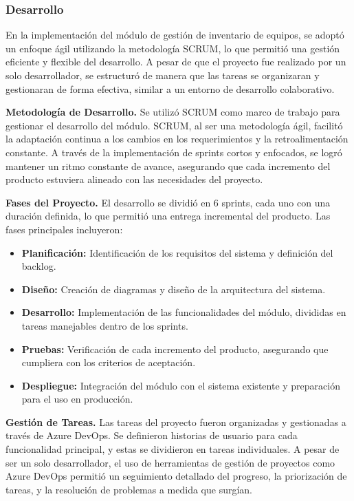 \documentclass[stu, 12pt, letterpaper, donotrepeattitle, floatsintext, natbib]{apa7}
\begin{document}
\subsubsection{Desarrollo}
En la implementación del módulo de gestión de inventario de equipos, se adoptó un enfoque ágil utilizando la metodología SCRUM, lo que permitió
una gestión eficiente y flexible del desarrollo. A pesar de que el proyecto fue realizado por un solo desarrollador, se estructuró de manera
que las tareas se organizaran y gestionaran de forma efectiva, similar a un entorno de desarrollo colaborativo.

\textbf{Metodología de Desarrollo. }Se utilizó SCRUM como marco de trabajo para gestionar el desarrollo del módulo. SCRUM, al ser una
metodología ágil, facilitó la adaptación continua a los cambios en los requerimientos y la retroalimentación constante. A través de la
implementación de sprints cortos y enfocados, se logró mantener un ritmo constante de avance, asegurando que cada incremento del producto
estuviera alineado con las necesidades del proyecto.

\textbf{Fases del Proyecto. }El desarrollo se dividió en 6 sprints, cada uno con una duración definida, lo que permitió una entrega incremental
del producto. Las fases principales incluyeron:
\begin{itemize}
    \item\textbf{Planificación: }Identificación de los requisitos del sistema y definición del backlog.
    \item\textbf{Diseño: }Creación de diagramas y diseño de la arquitectura del sistema.
    \item\textbf{Desarrollo: }Implementación de las funcionalidades del módulo, divididas en tareas manejables dentro de los sprints.
    \item\textbf{Pruebas: }Verificación de cada incremento del producto, asegurando que cumpliera con los criterios de aceptación.
    \item\textbf{Despliegue: }Integración del módulo con el sistema existente y preparación para el uso en producción.
\end{itemize}

\textbf{Gestión de Tareas. }Las tareas del proyecto fueron organizadas y gestionadas a través de Azure DevOps. Se definieron historias de
usuario para cada funcionalidad principal, y estas se dividieron en tareas individuales. A pesar de ser un solo desarrollador, el uso de
herramientas de gestión de proyectos como Azure DevOps permitió un seguimiento detallado del progreso, la priorización de tareas, y la
resolución de problemas a medida que surgían.
\end{document}
